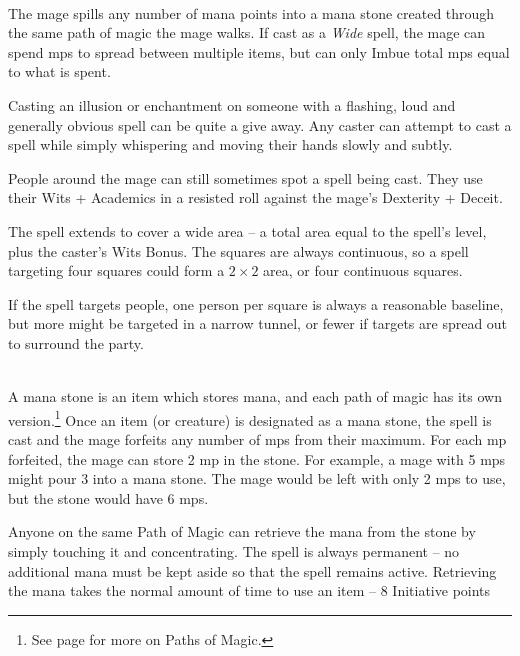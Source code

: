 \begin{multicols}{2}
\spelllevel

\\
The mage spills any number of mana points into a mana stone created through the same path of magic the mage walks.
If cast as a \textit{Wide} spell, the mage can spend \glspl{mp} to spread between multiple items, but can only Imbue total \glspl{mp} equal to what is spent.


Casting an illusion or enchantment on someone with a flashing, loud and generally obvious spell can be quite a give away.
Any caster can attempt to cast a spell while simply whispering and moving their hands slowly and subtly.

People around the mage can still sometimes spot a spell being cast. They use their Wits + Academics in a resisted roll against the mage's Dexterity + Deceit.

The spell extends to cover a wide area -- a total area equal to the spell's level, plus the caster's Wits Bonus.
The squares are always continuous, so a spell targeting four squares could form a $2\times 2$ area, or four continuous squares.

If the spell targets people, one person per square is always a reasonable baseline, but more might be targeted in a narrow tunnel, or fewer if targets are spread out to surround the party.

\spelllevel

\\
A mana stone is an item which stores mana, and each path of magic has its own version.\footnote{See page \pageref{magic_paths} for more on Paths of Magic.}
Once an item (or creature) is designated as a mana stone, the spell is cast and the mage forfeits any number of \glspl{mp} from their maximum.
For each \gls{mp} forfeited, the mage can store 2 \gls{mp} in the stone.
For example, a mage with 5 \glspl{mp} might pour 3 into a mana stone.
The mage would be left with only 2 \glspl{mp} to use, but the stone would have 6 \glspl{mp}.

Anyone on the same Path of Magic can retrieve the mana from the stone by simply touching it and concentrating.
The spell is always permanent -- no additional mana must be kept aside so that the spell remains active.
Retrieving the mana takes the normal amount of time to use an item -- 8 Initiative points


\end{multicols}
